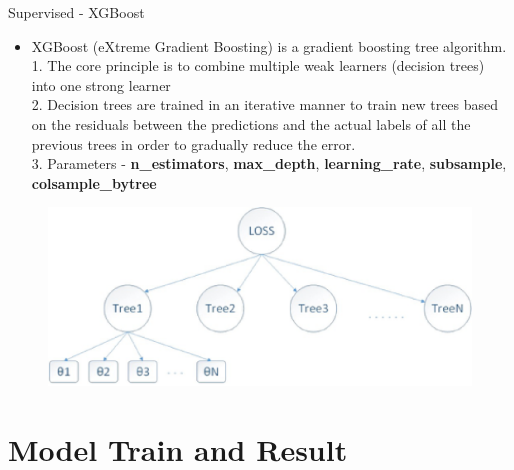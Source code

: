 \documentclass[
 size=14pt,
 paper=smartboard,  %
 mode=present, 		%
 display=slides, 	%
 style=tuliplab,  	%
 pauseslide,
 fleqn,leqno]{powerdot}
\begin{document}
\begin{slide}[toc=,bm=]{Supervised - XGBoost}
		\begin{itemize}
		\item
		XGBoost (eXtreme Gradient Boosting) is a gradient boosting tree algorithm.\\
		1. The core principle is to combine multiple weak learners (decision trees) into one strong learner\\
		2. Decision trees are trained in an iterative manner to train new trees based on the residuals between the predictions   and the actual labels of all the previous trees in order to gradually reduce the error.\\
		3. Parameters - \textbf{n_estimators}, \textbf{max_depth}, \textbf{learning_rate}, \textbf{subsample}, \textbf{colsample_bytree}
	\end{itemize}
	
	\begin{figure}
		\centering
		\includegraphics[scale=0.68]{xgb.eps}

	\end{figure}


\end{slide}


\section{Model Train and Result}
\end{document}
